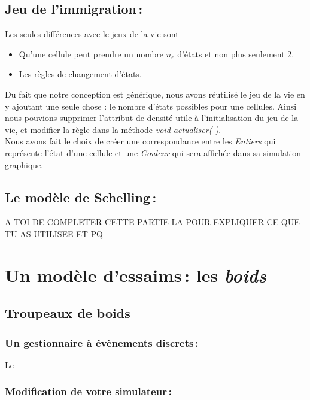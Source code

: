 \documentclass[a4paper, 10pt, french]{article}
\begin{document}
\subsection{Jeu de l'immigration\,:}
	{
Les seules différences avec le jeux de la vie sont 
	\begin{itemize}
		\item Qu'une cellule peut prendre un nombre {\em $n_e$} d'états et non plus seulement 2.
		\item Les règles de changement d'états.
	\end{itemize}
\indent Du fait que notre conception est générique, nous avons réutilisé le jeu de la vie en y ajoutant une seule chose : le nombre d'états possibles pour une cellules. Ainsi nous pouvions supprimer l'attribut de densité utile à l'initialisation du jeu de la vie, et modifier la règle dans la méthode {\em void actualiser( )}. 
\\ \indent Nous avons fait le choix de créer une correspondance entre les {\em Entiers} qui représente l'état d'une cellule et une {\em Couleur} qui sera affichée dans sa simulation graphique.
	}
\subsection{Le modèle de Schelling\,:}
 	{ 
	A TOI DE COMPLETER CETTE PARTIE LA POUR EXPLIQUER CE QUE TU AS UTILISEE ET PQ 
	} 

\section{Un modèle d'essaims\,: les {\em boids}}
  \subsection{Troupeaux de boids}
  {
  
  }
    \subsubsection{Un gestionnaire à évènements discrets\,:} 
      {
      Le
      } 
    \subsubsection{Modification de votre simulateur\,: } 
      {
       
      }
\end{document}
